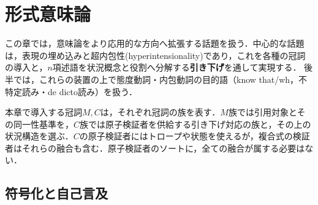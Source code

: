 \documentclass[../../main-detail.tex]{subfiles}
\begin{document}
\chapter{形式意味論}
この章では，意味論をより応用的な方向へ拡張する話題を扱う．中心的な話題は，表現の埋め込みと超内包性(hyperintensionality)であり，これを各種の冠詞の導入と，$n$項述語を状況概念と役割へ分解する\textbf{引き下げ}を通して実現する．
後半では，これらの装置の上で態度動詞・内包動詞の目的語（know that/wh，不特定読み・de dicto読み）を扱う．

本章で導入する冠詞$M,C$は，それぞれ冠詞の族を表す．$M$族では引用対象とその同一性基準を，$C$族では原子検証者を供給する引き下げ対応の族と，その上の状況構造を選ぶ．$C$の原子検証者にはトロープや状態を使えるが，複合式の検証者はそれらの融合も含む．原子検証者のソートに，全ての融合が属する必要はない．

\section{符号化と自己言及}
\end{document}
